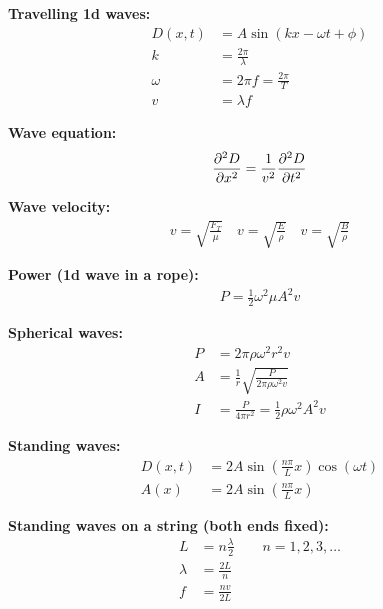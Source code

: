 \newpage
\begin{importantEquations}
\begin{multicols}{2}
\textbf{Travelling 1d waves:}
\begin{align*}
D(x,t) &= A \sin(kx-\omega t + \phi)\\
k &= \frac{2\pi}{\lambda}\\
\omega &= 2\pi f = \frac{2\pi}{T}\\
v &= \lambda f
\end{align*}

\textbf{Wave equation:}
\begin{align*}
\frac{\partial ^2D}{\partial x^2}=\frac{1}{v^2}\frac{\partial ^2D}{\partial t^2}
\end{align*}

\textbf{Wave velocity:}
\begin{align*}
v=\sqrt{\frac{F_T}{\mu}} \quad v=\sqrt{\frac{E}{\rho}} \quad v=\sqrt{\frac{B}{\rho}}
\end{align*}


\textbf{Power (1d wave in a rope):}
\begin{align*}
P = \frac{1}{2}\omega^2\mu A^2 v 
\end{align*}

\columnbreak

\textbf{Spherical waves:}
\begin{align*}
P &= 2\pi\rho\omega^2r^2 v\\
A &=\frac{1}{r}\sqrt{\frac{P}{2\pi\rho \omega^2 v}}\\
I&=\frac{P}{4\pi r^2}=\frac{1}{2}\rho\omega^2A^2v
\end{align*}

\textbf{Standing waves:}
\begin{align*}
D(x,t)&=2A\sin\left(\frac{n\pi}{L}x\right)\cos(\omega t)\\
A(x) &= 2A\sin\left(\frac{n\pi}{L}x\right)
\end{align*}

\textbf{Standing waves on a string (both ends fixed):}
\begin{align*}
L &= n\frac{\lambda}{2}\quad\quad n=1,2,3,\dots\\
\lambda &= \frac{2L}{n}\\
f &= \frac{nv}{2L}
\end{align*}
\end{multicols}
\end{importantEquations}

